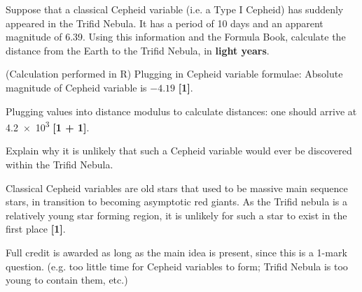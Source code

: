 \documentclass[a4paper,11pt,draft]{exam}
\begin{document}
\begin{questions}

\vspace*{-10pt}
\question[3]
	Suppose that a classical Cepheid variable (i.e. a Type I Cepheid) has suddenly appeared in the Trifid Nebula. It has a period of 10 days and an apparent magnitude of 6.39. Using this information and the Formula Book, calculate the distance from the Earth to the Trifid Nebula, in \textbf{light years}.
	\droppoints
	\begin{solution}
		(Calculation performed in R)
		Plugging in Cepheid variable formulae: Absolute magnitude of Cepheid variable is $ -4.19 $ \textbf{[1]}.
		
		Plugging values into distance modulus to calculate distances: one should arrive at \SI{4.2e3}{\lightyear} \textbf{[1 + 1]}. 
	\end{solution}
\setcounter{question}{9}
\question[1]
	Explain why it is unlikely that such a Cepheid variable would ever be discovered within the Trifid Nebula.
	\droppoints
	\begin{solution}
		Classical Cepheid variables are old stars that used to be massive main sequence stars, in transition to becoming asymptotic red giants. As the Trifid nebula is a relatively young star forming region, it is unlikely for such a star to exist in the first place \textbf{[1]}.
		
		Full credit is awarded as long as the main idea is present, since this is a 1-mark question. (e.g. too little time for Cepheid variables to form; Trifid Nebula is too young to contain them, etc.)
	\end{solution}
\end{questions}

\newpage
\end{document}
